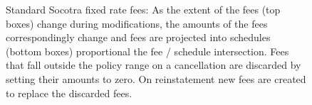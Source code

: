 \begin{figure}[h]
  \caption{
    Standard Socotra fixed rate fees: As the extent of the fees (top boxes) change during modifications, the
    amounts of the fees correspondingly change and fees are projected into schedules (bottom boxes) proportional
    the fee / schedule intersection. Fees that fall outside the policy range on a
    cancellation are discarded by setting their amounts to zero. On reinstatement new fees are
    created to replace the discarded fees.
  }
  \label{fig:3:1}
\end{figure}

